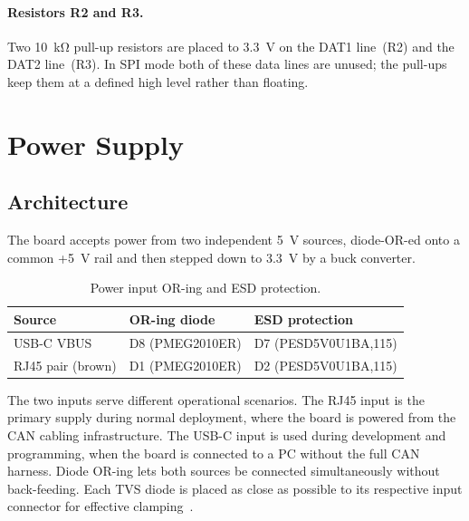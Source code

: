 \paragraph{Resistors R2 and R3.}
Two \SI{10}{\kilo\ohm} pull-up resistors are placed to \SI{3.3}{\volt} on the DAT1
line~(R2) and the DAT2 line~(R3). In SPI mode both of these data lines are unused; the
pull-ups keep them at a defined high level rather than floating.

\section{Power Supply}
\label{sec:power}

\subsection{Architecture}
\label{subsec:power-arch}

The board accepts power from two independent \SI{5}{\volt} sources, diode-OR-ed onto a
common +\SI{5}{\volt} rail and then stepped down to \SI{3.3}{\volt} by a buck converter.

\begin{table}[htbp]
  \centering
  \caption{Power input OR-ing and ESD protection.}
  \label{tab:power-inputs}
  \begin{tabular}{lll}
    \toprule
    Source       & OR-ing diode       & ESD protection           \\
    \midrule
    USB-C VBUS   & D8 (PMEG2010ER)    & D7 (PESD5V0U1BA,115)     \\
    RJ45 pair (brown) & D1 (PMEG2010ER) & D2 (PESD5V0U1BA,115)  \\
    \bottomrule
  \end{tabular}
\end{table}

The two inputs serve different operational scenarios. The RJ45 input is the primary supply
during normal deployment, where the board is powered from the CAN cabling
infrastructure. The USB-C input is used during development and programming, when the board
is connected to a PC without the full CAN harness. Diode OR-ing lets both sources be
connected simultaneously without back-feeding. Each TVS diode is placed as close as
possible to its respective input connector for effective clamping~\cite{ref10}.

